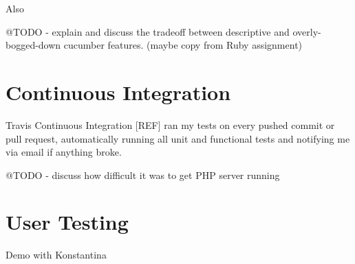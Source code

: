 Also

@TODO - explain and discuss the tradeoff between descriptive and overly-bogged-down cucumber features. (maybe copy from Ruby assignment)

\section{Continuous Integration}

Travis Continuous Integration [REF] ran my tests on every pushed commit or pull request, automatically running all unit and functional tests and notifying me via email if anything broke.

@TODO - discuss how difficult it was to get PHP server running

\section{User Testing}

Demo with Konstantina